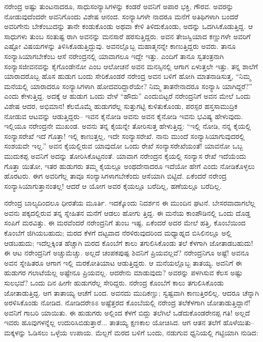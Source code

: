 ನರೇಂದ್ರ ಅಷ್ಟು ತುಂಟನಾದರೂ, ಸಾಧುಸಂನ್ಯಾಸಿಗಳನ್ನು ಕಂಡರೆ ಅವನಿಗೆ ಅಪಾರ ಭಕ್ತಿ, ಗೌರವ. ಅವರನ್ನು ನೋಡುವುದೆಂದರೇ ಅವನಿಗೊಂದು ವಿಶೇಷ ಆನಂದ. ಸಂನ್ಯಾಸಿಗಳೇ ನಾದರೂ ಮನೆಗೆ ಅತಿಥಿಗಳಾಗಿ ಬಂದರೆ ಅವರಿಗೇನು ಬೇಕೆಂಬುದನ್ನು ತಾನೇ ಕಂಡುಕೊಂಡು ಅಥವಾ ಕೇಳಿ ತಿಳಿದುಕೊಂಡು, ಅದನ್ನು ಒದಗಿಸಿಕೊಡುತ್ತಿದ್ದ. ಆ ಸಾಧುಗಳು ತುಂಬ ಸಂತುಷ್ಟ ರಾಗಿ ಅವನನ್ನು ಮನಸಾರೆ ಹರಸುತ್ತಿದ್ದರು. ಅವನ ತೇಜಸ್ವಿಯಾದ ಕಣ್ಣುಗಳೇ ಅವರಿಗೆ ಎಷ್ಟೋ ವಿಷಯಗಳನ್ನು ತಿಳಿಸಿಕೊಡುತ್ತಿದ್ದುವು. ಅವನಲ್ಲೊಬ್ಬ ಮಹಾತ್ಮನನ್ನೇ ಕಾಣುತ್ತಿದ್ದರು ಅವರು. ತಾನೂ ಸಂನ್ಯಾಸಿಯಾಗಬೇಕೆಂಬ ಆಸೆ ನರೇಂದ್ರನಲ್ಲಿ ಯಾವಾಗಲೂ ಇದ್ದೇ ಇತ್ತು. ಎಂದಿಗೆ ತಾನೂ ಸ್ವತಂತ್ರನಾಗಿ ಸಂನ್ಯಾಸಜೀವನವನ್ನು ಕೈಗೊಂಡೇನೋ ಎಂಬ ಆಲೋಚನೆ ಅವನ ಮನಸ್ಸಿನಲ್ಲಿ ಆಗಾಗ ಏಳುತ್ತಲೇ ಇತ್ತು. ತನ್ನ ಶಾಲೆಗೆ ಯಾರಾದರೊಬ್ಬ ಹೊಸ ಹುಡುಗ ಬಂದು ಸೇರಿಕೊಂಡರೆ ನರೇಂದ್ರ ಅವನ ಬಳಿಗೆ ಹೋಗಿ ಮಾತನಾಡಿಸುತ್ತ, “ನಿಮ್ಮ ಮನೆಯಲ್ಲಿ ಯಾರಾದರೂ ಸಂನ್ಯಾಸಿಗಳಾಗಿ ಹೋದವರಿದ್ದಾರೆಯೇ? ನಿಮ್ಮ ತಾತನೇನಾದರೂ ಸಂನ್ಯಾಸಿ ಯಾಗಿದ್ದರೆ?” ಎಂದು ಕೇಳುತ್ತಿದ್ದ. ಅದಕ್ಕೆ ಆ ಹುಡುಗ ಒಂದು ವೇಳೆ “ಹೌದು” ಎಂದುಬಿಟ್ಟರೆ ನರೇಂದ್ರನಿಗೆ ಅವನ ಮೇಲೆ ಒಂದು ವಿಶೇಷ ಆದರ, ಅಭಿಮಾನ! ಕೆಲಮೊಮ್ಮೆ ಹುಡುಗರೆಲ್ಲ ಸುತ್ತುಗಟ್ಟಿ ಕುಳಿತುಕೊಂಡು, ಪರಸ್ಪರ ಹಸ್ತಸಾಮುದ್ರಿಕ ನೋಡುವ ಆಟವನ್ನು ಆಡುತ್ತಿದ್ದರು– ಇವನ ಕೈನೋಡಿ ಅವನು ಅವನ ಕೈನೋಡಿ ಇವನು ಭವಿಷ್ಯ ಹೇಳುವುದು. ಇಲ್ಲಿಯೂ ನರೇಂದ್ರನೇ ಮುಖಂಡ. ಅವನು ತನ್ನ ಕೈಯನ್ನೇ ತೋರಿಸುತ್ತ ಹೇಳುತ್ತಿದ್ದ: “ಇಲ್ಲಿ ನೋಡಿ, ನನ್ನ ಕೈಯಲ್ಲಿ ಸಂನ್ಯಾಸರೇಖೆ ಇದೆ ಗೊತ್ತಾ! ಇಲ್ಲಿ ಕಾಣುತ್ತಲ್ಲ, ಇದೇ ಸಂನ್ಯಾಸರೇಖೆ. ನಾನು ಮುಂದೆ ಸಂನ್ಯಾಸಿಯಾಗುವುದರಲ್ಲಿ ಸಂಶಯವೇ ಇಲ್ಲ.” ಅವನ ಕೈಯಲ್ಲಿರುವ ಯಾವುದೋ ಒಂದು ರೇಖೆ ಸಂನ್ಯಾಸರೇಖೆಯಂತೆ! ಯಾವನೋ ಒಬ್ಬ ಮುದುಕಪ್ಪ ಅವನಿಗೆ ಅದನ್ನು ತೋರಿಸಿಕೊಟ್ಟನಂತೆ. ಯಾವಾಗ ನರೇಂದ್ರನ ಕೈಯಲ್ಲಿ ಸಂನ್ಯಾಸ ರೇಖೆ ಇದೆಯೆಂದು ಗೊತ್ತಾ ಯಿತೋ, ಇತರ ಹುಡುಗರು ತಮ್ಮ ಕೈಯಲ್ಲೂ ಅಂಥದೇನಾದರೂ ಇದೆಯೋ ಹೇಗೆ ಎಂದು ನೋಡಿಕೊಳ್ಳಲು ಹೊರಟರು. ಈಗ ಅವರಿಗೆಲ್ಲ ತಾವೂ ಸಂನ್ಯಾಸಿಗಳಾಗಬೇಕೆಂದು ಆಸೆಯಾಗಿ ಬಿಟ್ಟಿದೆ. ಏಕೆಂದರೆ ನರೇಂದ್ರ ಸಂನ್ಯಾಸಿಯಾಗುತ್ತಾನಂತಲ್ಲ! ಆದರೆ ಆ ಯೋಗ ಅವರ ಕೈಯಲ್ಲೂ ಬರೆದಿಲ್ಲ, ಹಣೆಯಲ್ಲೂ ಬರೆದಿಲ್ಲ.

ನರೇಂದ್ರ ಬಾಲ್ಯದಿಂದಲೂ ಧೀರತೆಯ ಮೂರ್ತಿ. ಇದಕ್ಕೊಂದು ನಿದರ್ಶನ ಈ ಮುಂದಿನ ಘಟನೆ. ಬೇಸರವಾದಾಗಲೆಲ್ಲ ಅವನು ಪಕ್ಕದಲ್ಲಿರುವ ತನ್ನ ಸ್ನೇಹಿತನ ಮನೆಗೆ ಆಡಲು ಹೋಗು ತ್ತಿದ್ದ. ಈ ಮನೆಯ ಕಾಂಪೌಡಿನಲ್ಲಿ ಒಂದು ದೊಡ್ಡ ಸಂಪಿಗೆ ಮರವಿತ್ತು. ಈ ಮರವೆಂದರೆ ನರೇಂದ್ರನಿಗೆ ತುಂಬ ಇಷ್ಟ. ಏಕೆಂದರೆ ಅದರ ಮೇಲೆ ಹತ್ತಿ, ಕೊಂಬೆಯಿಂದ ಕೊಂಬೆಗೆ ಜಿಗಿಯಬಹುದು; ಮರದ ಕೆಳಗೆ ದಟ್ಟವಾದ ನೆರಳಿರುವುದರಿಂದ ಮಧ್ಯಾಹ್ನದ ಬಿಸಿಲಿನಲ್ಲೂ ಅಲ್ಲಿ ಆಡಬಹುದು; ಇದೆಲ್ಲಕ್ಕಿಂತ ಹೆಚ್ಚಾಗಿ ಮರದ ಕೊಂಬೆಗೆ ಕಾಲು ತಗುಲಿಸಿಕೊಂಡು ತಲೆ ಕೆಳಗಾಗಿ ಜೋತಾಡಬಹುದು! ಈ ಆಟ ನರೇಂದ್ರನಿಗೆ ಅಚ್ಚುಮೆಚ್ಚು. ಅಲ್ಲದೆ ಚಂಪಕಪುಷ್ಪ ಶಿವನಿಗೆ ಪ್ರಿಯವಲ್ಲವೆ? ನರೇಂದ್ರನಿಗೂ ಅಷ್ಟೆ! ಅವನೂ ಅವನ ಸ್ನೇಹಿತರೂ ಆಗಾಗ ಇಲ್ಲಿ ಮರಕೋತಿಯಾಟ ಆಡುತ್ತಿದ್ದರು. ಆ ಮನೆಯಲ್ಲೊಬ್ಬ ತಾತಯ್ಯ. ಅವನಿಗೆ ಈ ಹುಡುಗರ ಗಲಾಟೆಯೆಲ್ಲ ಅಷ್ಟೇನೂ ಪ್ರಿಯವಲ್ಲ. ಆದರೇನು ಮಾಡುವುದು? ಅವರನ್ನು ಪಳಗಿಸುವ ಕೆಲಸ ಅಷ್ಟು ಸುಲಭವೆ? ಒಂದು ದಿನ ಹೀಗೇ ಹುಡುಗರೆಲ್ಲ ಸೇರಿದ್ದರು. ನರೇಂದ್ರ ಕೊಂಬೆಗೆ ಕಾಲು ತಗುಲಿಸಿಕೊಂಡು ಜೋತಾಡುತ್ತಿದ್ದ. ಆಗ ತಾತಾಯ್ಯ ಆಚೆಗೆ ಬಂದ. ಅವನದು ಮುದಿಕಣ್ಣು; ಸ್ವಷ್ಟವಾಗಿ ಕಾಣುತ್ತಿರಲಿಲ್ಲ. ಆದರೂ ಚೆನ್ನಾಗಿ ಅರಳಿಸಿಕೊಂಡು ನೋಡಿದ. ನೋಡಿದರೇಽಽ ಅಷ್ಟೆತ್ತರದ ಕೊಂಬೆಯಲ್ಲಿ ನರೇಂದ್ರ ತಲೆಕೆಳಗಾಗಿ ಜೋತಾಡುತ್ತಿದ್ದಾನೆ! ಅವನಿಗೆ ಗಾಬರಿ ಯಾಯಿತು. ಈ ಹುಡುಗರು ಅಲ್ಲಿಂದ ಕೆಳಗೆ ಬಿದ್ದು ತಲೆಗಿಲೆ ಒಡೆದುಕೊಂಡರೇನಪ್ಪ ಗತಿ! ಅಲ್ಲದೆ ಇವರು ಹೂವುಗಳನ್ನೆಲ್ಲ ಉದುರಿಸಿಬಿಡುತ್ತಾರೆ... ತಾತಯ್ಯ ಕ್ಷಣಕಾಲ ಯೋಚಿಸಿದ. ಆಗ ಆತನ ತಲೆಗೆ ಹೊಳೆಯಿತು–ಮಕ್ಕಳನ್ನು ಓಡಿಸಲು ಒಳ್ಳೆಯ ಉಪಾಯ. ಮೆಲ್ಲಗೆ ಮರದ ಬಳಿಗೆ ಬಂದು, ನಡುಗುವ ಧ್ವನಿಯಲ್ಲಿ ಗಟ್ಟಿಯಾಗಿ ನುಡಿದ:

